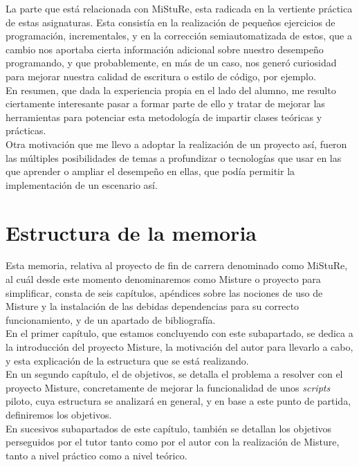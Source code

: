 La parte que está relacionada con MiStuRe, esta radicada en la vertiente práctica de estas asignaturas. Esta consistía en la realización de pequeños ejercicios de programación, incrementales, y en la corrección semiautomatizada de estos, que a cambio nos aportaba cierta información adicional sobre nuestro desempeño programando, y que probablemente, en más de un caso, nos generó curiosidad para mejorar nuestra calidad de escritura o estilo de código, por ejemplo.\\


En resumen, que dada la experiencia propia en el lado del alumno, me resulto ciertamente interesante pasar a formar parte de ello y tratar de mejorar las herramientas para potenciar esta metodología de impartir clases teóricas y prácticas.\\


Otra motivación que me llevo a adoptar la realización de un proyecto así, fueron las múltiples posibilidades de temas a profundizar o tecnologías que usar en las que aprender o ampliar el desempeño en ellas, que podía permitir la implementación de un escenario así.\\


\section{Estructura de la memoria}

Esta memoria, relativa al proyecto de fin de carrera denominado como MiStuRe, al cuál desde este momento denominaremos como Misture o proyecto para simplificar, consta de seis capítulos, apéndices sobre las nociones de uso de Misture y la instalación de las debidas dependencias para su correcto funcionamiento, y de un apartado de bibliografía.\\


En el primer capítulo, que estamos concluyendo con este subapartado, se dedica a la introducción del proyecto Misture, la motivación del autor para llevarlo a cabo, y esta explicación de la estructura que se está realizando.\\


En un segundo capítulo, el de objetivos, se detalla el problema a resolver con el proyecto Misture, concretamente de mejorar la funcionalidad de unos \textit{scripts} piloto, cuya estructura se analizará en general, y en base a este punto de partida, definiremos los objetivos.\\


En sucesivos subapartados de este capítulo, también se detallan los objetivos perseguidos por el tutor tanto como por el autor con la realización de Misture, tanto a nivel práctico como a nivel teórico.\\


